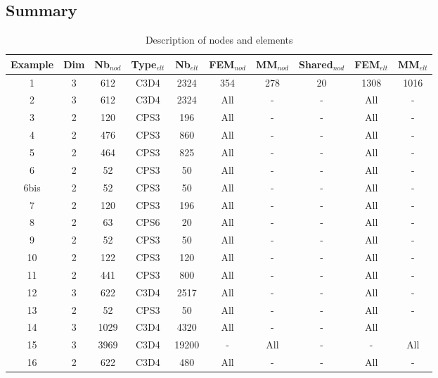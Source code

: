 \documentclass[oneside,11pt,times]{book}
\begin{document}
\subsection{Summary}
\begin{table}[h!]
\centering
\caption{Description of nodes and elements}
\label{tab elt}
\vspace{0.5cm}
    \begin{tabular}{|c|c|c|c|c|c|c|c|c|c|}
    \hline
    Example & Dim & Nb$_{nod}$ &  Type$_{elt}$ & Nb$_{elt}$ & FEM$_{nod}$ & MM$_{nod}$ & Shared$_{nod}$ & FEM$_{elt}$  & MM$_{elt}$\\
    \hline
    \hline
    1 & 3 & 612 & C3D4 & 2324 & 354 & 278 & 20 & 1308 & 1016\\
    2 & 3 & 612 & C3D4 & 2324 & All & - & - & All & - \\
    3 & 2 & 120 & CPS3 & 196 & All & - & - & All & - \\
    4 & 2 & 476 & CPS3 & 860 & All & - & - & All & - \\
    5 & 2 & 464 & CPS3 & 825 & All & - & - & All & - \\
    6 & 2 & 52 & CPS3 & 50 & All & - & - & All & - \\
    6bis & 2 & 52 & CPS3 & 50 & All & - & - & All & - \\
    7 & 2 & 120 & CPS3 & 196 & All & - & - & All & - \\
    8 & 2 & 63 & CPS6 & 20 & All & - & - & All & - \\
    9 & 2 & 52 & CPS3 & 50 & All & - & - & All & - \\
    10 & 2 & 122 & CPS3 & 120 & All & - & - & All & - \\
    11 & 2 & 441 & CPS3 & 800 & All & - & - & All & - \\
    12 & 3 & 622 & C3D4 & 2517 & All & - & - & All & - \\
    13 & 2 & 52 & CPS3 & 50 & All & - & - & All & - \\
    14 & 3 & 1029 & C3D4 & 4320 & All & - & - & All &  \\
    15 & 3 & 3969 & C3D4 & 19200 & - & All & - & - & All \\
    16 & 2 & 622 & C3D4 & 480 & All & - & - & All & - \\
    \hline
    \end{tabular}
\end{table}
\end{document}
